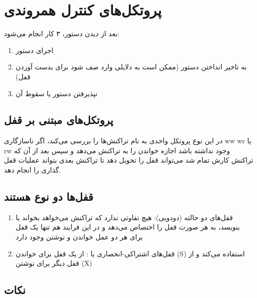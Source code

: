 \section{پروتکل‌های کنترل همروندی}

بعد از دیدن دستور، ۳ کار انجام می‌شود:

\begin{enumerate}
    \item اجرای دستور
    \item به تاخیر انداختن دستور (ممکن است به دلایلی وارد صف شود برای بدست آوردن
    قفل)
    \item نپذیرفتن دستور یا سقوط آن
\end{enumerate}

\subsection{پروتکل‌های مبتنی بر قفل}

در این نوع پروتکل واحدی به نام  تراکنش‌ها را بررسی می‌کند، اگر
ناسازگاری ww wr یا rw وجود نداشته باشد اجازه خواندن را به تراکنش می‌دهد و سپس
بعد از آن که تراکنش کارش تمام شد می‌تواند قفل را تحویل دهد تا تراکنش بعدی بتواند
عملیات قفل گذاری را انجام دهد.

\subsection*{قفل‌ها دو نوع هستند}

\begin{enumerate}
    \item قفل‌های دو حالته (دودویی): هیچ تفاوتی ندارد که تراکنش می‌خواهد بخواند
    یا بنویسد، به هر صورت قفل را اختصاص می‌دهد و در این فرایند هم تنها یک قفل
    برای هر دو عمل خواندن و نوشتن وجود دارد
    \item قفل‌های اشتراکی-انحصاری یا : از یک قفل برای
    خواندن (S) استفاده می‌کند و از قفل دیگر برای نوشتن (X)
\end{enumerate}

\subsection*{نکات}

